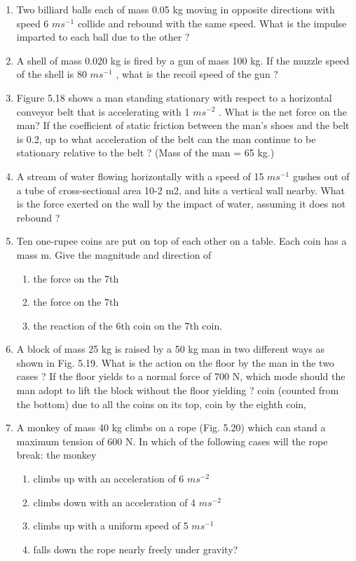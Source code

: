 \begin{enumerate}[label=\arabic*.,ref=\thesection.\theenumi]
\item Two billiard balls each of mass 0.05 kg moving in opposite directions with speed 6 $m s^{-1}$ collide and rebound with the same speed. What is the impulse imparted to each ball due to the other ?
\item  A shell of mass 0.020 kg is fired by a gun of mass 100 kg. If the muzzle speed of the shell is 80 $m s^{-1}$
, what is the recoil speed of the gun ?
\item Figure 5.18 shows a man standing stationary with respect to a horizontal conveyor belt that is accelerating with 1 $m s^{-2}$
. What is the net force on the man? If the
coefficient of static friction between the man's shoes and the belt is 0.2, up to what acceleration of the belt can the man continue to be stationary relative to the belt ? (Mass of the man = 65 kg.)
\item  A stream of water flowing horizontally with a speed of 15 $m s^{-1}$ gushes out of a tube of
cross-sectional area 10-2 m2, and hits a vertical wall nearby. What is the force exerted on the wall by the impact of water, assuming it does not rebound ?
\item Ten one-rupee coins are put on top of each other on a table. Each coin has a mass m. Give the magnitude and direction of 
\begin{enumerate}
\item the force on the 7th 
\item the force on the 7th 
\item  the reaction of the 6th coin on the 7th coin.
\end{enumerate}
\item  A block of mass 25 kg is raised by a 50 kg man in two different ways as shown in Fig. 5.19. What is the action on the floor by the man in the two cases ? If the floor yields to a normal force of 700 N, which mode should the man adopt to lift the block without the floor yielding ?
coin (counted from the bottom) due to all the coins on its top, coin by the eighth coin,
\item A monkey of mass 40 kg climbs on a rope (Fig. 5.20) which can stand a maximum tension of 600 N. In which of the
following cases will the rope break: the monkey 
\begin{enumerate}
\item climbs up with an acceleration of 6 $m s^{-2}$ 
\item climbs down with an acceleration of 4 $m s^{-2}$ 
\item  climbs up with a uniform speed of 5 $m s^{-1}$
\item  falls down the rope nearly freely under gravity?
\end{enumerate}


\end{enumerate}
